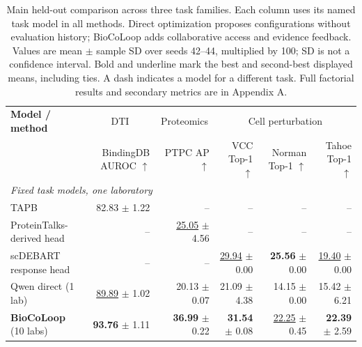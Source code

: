 \begin{table}[t]
\caption{Main held-out comparison across three task families. Each column uses its named task model in all methods. Direct optimization proposes configurations without evaluation history; BioCoLoop adds collaborative access and evidence feedback. Values are mean $\pm$ sample SD over seeds 42--44, multiplied by 100; SD is not a confidence interval. Bold and underline mark the best and second-best displayed means, including ties. A dash indicates a model for a different task. Full factorial results and secondary metrics are in Appendix A.}
\label{tab:strong-main}
\centering\footnotesize
\setlength{\tabcolsep}{3pt}
\renewcommand{\arraystretch}{1.12}
\begin{tabularx}{\linewidth}{@{}Xrrrrr@{}}
\toprule
\textbf{Model / method} & \multicolumn{1}{c}{DTI} & \multicolumn{1}{c}{Proteomics} & \multicolumn{3}{c}{Cell perturbation} \\
\cmidrule(lr){2-2}\cmidrule(lr){3-3}\cmidrule(l){4-6}
 & \shortstack{BindingDB\\AUROC $\uparrow$} & \shortstack{PTPC\\AP $\uparrow$} & \shortstack{VCC\\Top-1 $\uparrow$} & \shortstack{Norman\\Top-1 $\uparrow$} & \shortstack{Tahoe\\Top-1 $\uparrow$} \\
\midrule
\multicolumn{6}{l}{\textit{Fixed task models, one laboratory}} \\
TAPB & 82.83 $\pm$ 1.22 & -- & -- & -- & -- \\
ProteinTalks-derived head & -- & \underline{25.05} $\pm$ 4.56 & -- & -- & -- \\
scDEBART response head & -- & -- & \underline{29.94} $\pm$ 0.00 & \textbf{25.56} $\pm$ 0.00 & \underline{19.40} $\pm$ 0.00 \\
\midrule
Qwen direct (1 lab) & \underline{89.89} $\pm$ 1.02 & 20.13 $\pm$ 0.07 & 21.09 $\pm$ 4.38 & 14.15 $\pm$ 0.00 & 15.42 $\pm$ 6.21 \\
\textbf{BioCoLoop} (10 labs) & \textbf{93.76} $\pm$ 1.11 & \textbf{36.99} $\pm$ 0.22 & \textbf{31.54} $\pm$ 0.08 & \underline{22.25} $\pm$ 0.45 & \textbf{22.39} $\pm$ 2.59 \\
\bottomrule
\end{tabularx}
\end{table}
